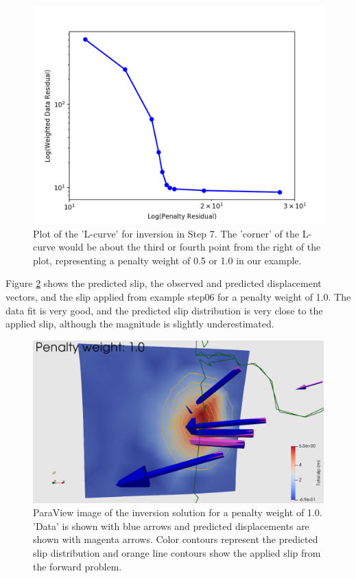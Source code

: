 \begin{figure}
  \includegraphics[width=4.5in]{examples/figs/subduction3d_step07_inverse_curve}
  \caption{Plot of the 'L-curve' for inversion in Step 7. The
    'corner' of the L-curve would be about the third or fourth point
    from the right of the plot, representing a penalty weight of 0.5
    or 1.0 in our example. }
  \label{fig:example:subduction:3d:step07:optimal}
\end{figure}

Figure \ref{fig:example:subduction:3d:step07:soln} shows the
predicted slip, the observed and predicted displacement vectors, and
the slip applied from example step06 for a penalty weight of 1.0. The
data fit is very good, and the predicted slip distribution is very
close to the applied slip, although the magnitude is slightly
underestimated.

\begin{figure}
  \includegraphics[width=4.5in]{examples/figs/subduction3d_step07_inverse_soln}
  \caption{ParaView image of the inversion solution for a penalty
    weight of 1.0. 'Data' is shown with blue arrows and predicted
    displacements are shown with magenta arrows. Color contours
    represent the predicted slip distribution and orange line contours
    show the applied slip from the forward problem.}
  \label{fig:example:subduction:3d:step07:soln}
\end{figure}

